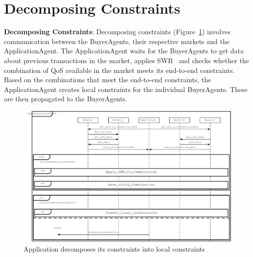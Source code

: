 \documentclass[10pt,journal,compsoc]{IEEEtran}
\begin{document}
\appendix 
\section{Decomposing Constraints}\label{auml_appendix}
\textbf{Decomposing Constraints}: Decomposing constraints (Figure~\ref{fig:decompose_constraints}) involves communication between the BuyerAgents, their respective markets and the ApplicationAgent. The ApplicationAgent waits for the BuyerAgents to get data about previous transactions in the market, applies SWR~\cite{Cardoso2002Workflow} and checks whether the combination of QoS available in the market meets its end-to-end constraints. Based on the combinations that meet the end-to-end constraints, the ApplicationAgent creates local constraints for the individual BuyerAgents. These are then propagated to the BuyerAgents.

\begin{figure}[h]
\centering
\includegraphics[scale=0.7]{drawings/decompose_constraints.pdf}
\caption{Application decomposes its constraints into local constraints \label{fig:decompose_constraints}}
\end{figure}
\end{document}
